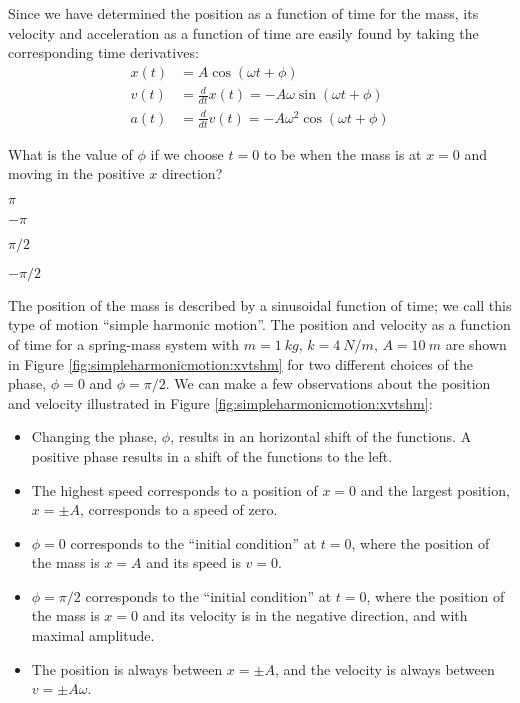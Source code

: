 Since we have determined the position as a function of time for the mass, its velocity and acceleration as a function of time are easily found by taking the corresponding time derivatives:
\begin{align*}
x(t) &= A \cos(\omega t + \phi)\\
v(t) &= \frac{d}{dt}x(t) = -A\omega\sin(\omega t + \phi)\\
a(t)&= \frac{d}{dt}v(t) = -A\omega^2\cos(\omega t + \phi)
\end{align*}

\begin{checkpoint}
\begin{MCquestion}{What is the value of $\phi$ if we choose $t=0$ to be when the mass is at $x=0$ and moving in the positive $x$ direction?}
\item $\pi$
\item $-\pi$
\item $\pi/2$
\item $-\pi/2$ \correct
\end{MCquestion}
\end{checkpoint}

The position of the mass is described by a sinusoidal function of time; we call this type of motion ``simple harmonic motion''. The position and velocity as a function of time for a spring-mass system with $m=\SI{1}{kg}$, $k=\SI{4}{N/m}$, $A=\SI{10}{m}$ are shown in Figure \ref{fig:simpleharmonicmotion:xvtshm} for two different choices of the phase, $\phi=0$ and $\phi=\pi/2$.
We can make a few observations about the position and velocity illustrated in Figure \ref{fig:simpleharmonicmotion:xvtshm}:
\begin{itemize}
\item Changing the phase, $\phi$, results in an horizontal shift of the functions. A positive phase results in a shift of the functions to the left.
\item The highest speed corresponds to a position of $x=0$ and the largest position, $x=\pm A$, corresponds to a speed of zero.
\item $\phi = 0$ corresponds to the ``initial condition'' at $t=0$, where the position of the mass is $x=A$ and its speed is $v=0$.
\item $\phi = \pi/2$ corresponds to the ``initial condition'' at $t=0$,  where the position of the mass is $x=0$ and its velocity is in the negative direction, and with maximal amplitude.
\item The position is always between $x=\pm A$, and the velocity is always between $v=\pm A\omega$.
\end{itemize}


